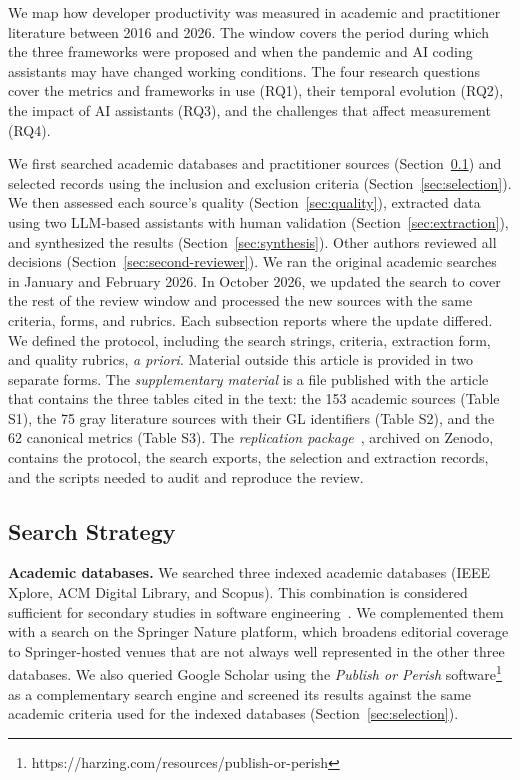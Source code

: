 \documentclass[preprint,number]{elsarticle}
\begin{document}
We map how developer productivity was measured in academic and practitioner literature between 2016 and 2026. The window covers the period during which the three frameworks were proposed and when the pandemic and AI coding assistants may have changed working conditions. The four research questions cover the metrics and frameworks in use (RQ1), their temporal evolution (RQ2), the impact of AI assistants (RQ3), and the challenges that affect measurement (RQ4). 

We first searched academic databases and practitioner sources (Section~\ref{sec:search}) and selected records using the inclusion and exclusion criteria (Section~\ref{sec:selection}). We then assessed each source's quality (Section~\ref{sec:quality}), extracted data using two LLM-based assistants with human validation (Section~\ref{sec:extraction}), and synthesized the results (Section~\ref{sec:synthesis}). Other authors reviewed all decisions (Section~\ref{sec:second-reviewer}). We ran the original academic searches in January and February 2026. In October 2026, we updated the search to cover the rest of the review window and processed the new sources with the same criteria, forms, and rubrics. Each subsection reports where the update differed. We defined the protocol, including the search strings, criteria, extraction form, and quality rubrics, \textit{a priori}. Material outside this article is provided in two separate forms. The \textit{supplementary material} is a file published with the article that contains the three tables cited in the text: the 153 academic sources (Table S1), the 75 gray literature sources with their GL identifiers (Table S2), and the 62 canonical metrics (Table S3). The \textit{replication package}~\cite{replication2026}, archived on Zenodo, contains the protocol, the search exports, the selection and extraction records, and the scripts needed to audit and reproduce the review.

\subsection{Search Strategy}
\label{sec:search}

\textbf{Academic databases.}
We searched three indexed academic databases (IEEE Xplore, ACM Digital Library, and Scopus). This combination is considered sufficient for secondary studies in software engineering~\cite{garousi2019mlr}. We complemented them with a search on the Springer Nature platform, which broadens editorial coverage to Springer-hosted venues that are not always well represented in the other three databases. We also queried Google Scholar using the \textit{Publish or Perish} software\footnote{https://harzing.com/resources/publish-or-perish} as a complementary search engine and screened its results against the same academic criteria used for the indexed databases (Section~\ref{sec:selection}).
\end{document}
